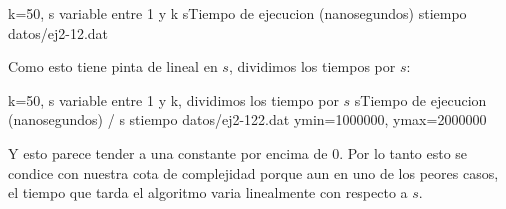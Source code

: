 \graficarDatos
{k=50, s variable entre 1 y k}
{s}{Tiempo de ejecucion (nanosegundos)}
{s}{tiempo}
{datos/ej2-12.dat}

Como esto tiene pinta de lineal en $s$, dividimos los tiempos por $s$:

\graficarDatosPlus
{k=50, s variable entre 1 y k, dividimos los tiempo por $s$}
{s}{Tiempo de ejecucion (nanosegundos) / s}
{s}{tiempo}
{datos/ej2-122.dat}
{ymin=1000000, ymax=2000000}

Y esto parece tender a una constante por encima de 0. Por lo tanto esto se condice con nuestra cota de complejidad porque aun en uno de los peores casos, el tiempo que tarda el algoritmo varia linealmente con respecto a $s$.